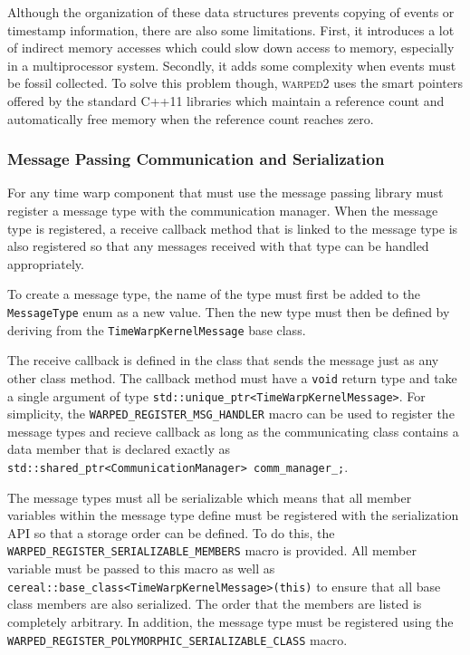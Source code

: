 \documentclass[11pt]{book}
\begin{document}
Although the organization of these data structures prevents copying of events or timestamp
information, there are also some limitations.  First, it introduces a lot of indirect memory
accesses which could slow down access to memory, especially in a multiprocessor system.  Secondly,
it adds some complexity when events must be fossil collected.  To solve this problem though,
\textsc{warped2} uses the smart pointers offered by the standard C++11 libraries which maintain
a reference count and automatically free memory when the reference count reaches zero.

\subsubsection{Message Passing Communication and Serialization}

For any time warp component that must use the message passing library must register a message
type with the communication manager.  When the message type is registered, a receive callback
method that is linked to the message type is also registered so that any messages received with
that type can be handled appropriately.

To create a message type, the name of the type must first be added to the \texttt{MessageType}
enum as a new value. Then the new type must then be defined by deriving from the
\texttt{TimeWarpKernelMessage} base class.

The receive callback is defined in the class that sends the message just as any other class
method.  The callback method must have a \texttt{void} return type and take a single argument
of type \texttt{std::unique\_ptr<TimeWarpKernelMessage>}.  For simplicity, the
\texttt{WARPED\_REGISTER\_MSG\_HANDLER} macro can be used to register the message types
and recieve callback as long as the communicating class contains a data member that is declared
exactly as \texttt{std::shared\_ptr<CommunicationManager> comm\_manager\_;}.

The message types must all be serializable which means that all member variables within the
message type define must be registered with the serialization API so that a storage order can
be defined.  To do this, the \texttt{WARPED\_REGISTER\_SERIALIZABLE\_MEMBERS} macro is provided.
All member variable must be passed to this macro as well as
\texttt{cereal::base\_class<TimeWarpKernelMessage>(this)} to ensure that all base class members
are also serialized.  The order that the members are listed is completely arbitrary.  In addition,
the message type must be registered using the \texttt{WARPED\_REGISTER\_POLYMORPHIC\_SERIALIZABLE\_CLASS}
macro.
\end{document}
